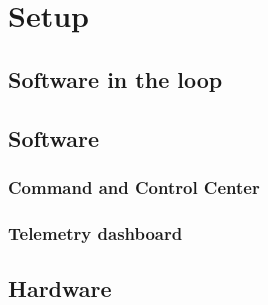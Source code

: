 
\chapter{Setup}


\section{Software in the loop}



\section{Software}

\subsection{Command and Control Center}

\subsection{Telemetry dashboard}

\section{Hardware}


